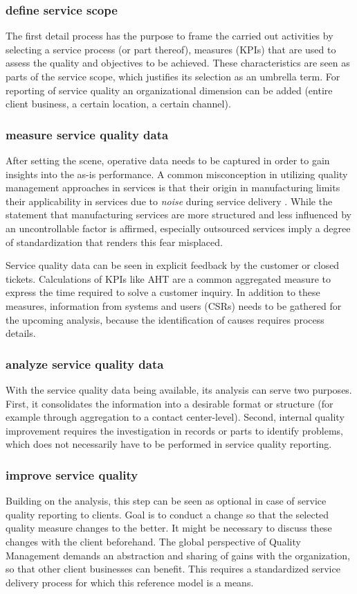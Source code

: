 		\subsubsection{define service scope}
		The first detail process has the purpose to frame the carried out activities by selecting a service process (or part thereof), measures (\acrshort{KPI}s) that are used to assess the quality and objectives to be achieved. These characteristics are seen as parts of the service scope, which justifies its selection as an umbrella term. For reporting of service quality an organizational dimension can be added (entire client business, a certain location, a certain channel). 
		\subsubsection{measure service quality data}
		After setting the scene, operative data needs to be captured in order to gain insights into the as-is performance. A common misconception in utilizing quality management approaches in services is that their origin in manufacturing limits their applicability in services due to \textit{noise} during service delivery \citep{Antony_2007}. While the statement that manufacturing services are more structured and less influenced by an uncontrollable factor is affirmed, especially outsourced services imply a degree of standardization that renders this fear misplaced. 
		
		Service quality data can be seen in explicit feedback by the customer or closed tickets. Calculations of \acrshort{KPI}s like \acrfull{AHT} are a common aggregated measure to express the time required to solve a customer inquiry. In addition to these measures, information from systems and users (\acrshort{CSR}s) needs to be gathered for the upcoming analysis, because the identification of causes requires process details. 
		\subsubsection{analyze service quality data}
		With the service quality data being available, its analysis can serve two purposes. First, it consolidates the information into a desirable format or structure (for example through aggregation to a contact center-level). Second, internal quality improvement requires the investigation in records or parts to identify problems, which does not necessarily have to be performed in service quality reporting. 
		
		\subsubsection{improve service quality}
		Building on the analysis, this step can be seen as optional in case of service quality reporting to clients. Goal is to conduct a change so that the selected quality measure changes to the better. It might be necessary to discuss these changes with the client beforehand. The global perspective of Quality Management demands an abstraction and sharing of gains with the organization, so that other client businesses can benefit. This requires a standardized service delivery process for which this reference model is a means. 
		
